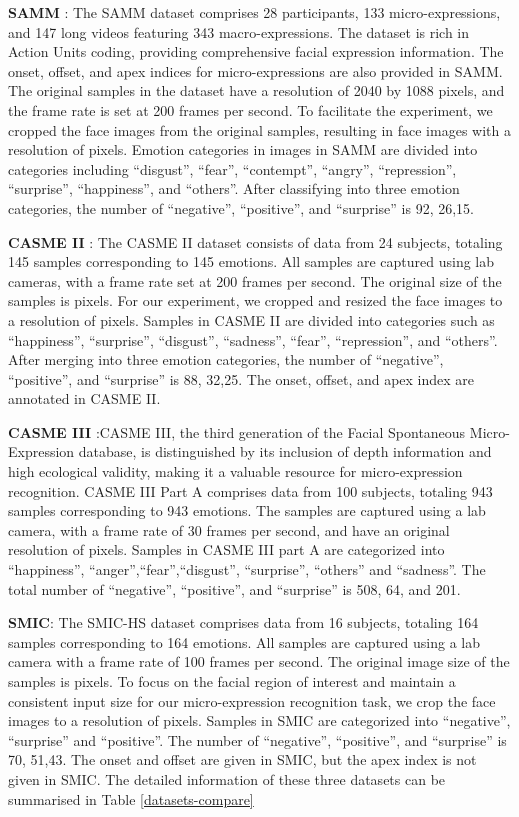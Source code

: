 \documentclass[review,12pt, 3p]{elsarticle}
\begin{document}
\textbf{SAMM} \cite{ref-48}: The SAMM dataset comprises 28 participants, 133 micro-expressions, and 147 long videos featuring 343 macro-expressions. The dataset is rich in Action Units coding, providing comprehensive facial expression information. The onset, offset, and apex indices for micro-expressions are also provided in SAMM. The original samples in the dataset have a resolution of 2040 by 1088 pixels, and the frame rate is set at 200 frames per second. To facilitate the experiment, we cropped the face images from the original samples, resulting in face images with a resolution of  pixels. Emotion categories in images in SAMM are divided into categories including ``disgust'', ``fear'', ``contempt'', ``angry'', ``repression'', ``surprise'', ``happiness'', and ``others''. After classifying into three emotion categories, the number of ``negative'', ``positive'', and ``surprise'' is 92, 26,15. 

\textbf{CASME II} \cite{ref-50}: The CASME II dataset consists of data from 24 subjects, totaling 145 samples corresponding to 145 emotions. All samples are captured using lab cameras, with a frame rate set at 200 frames per second. The original size of the samples is  pixels. For our experiment, we cropped and resized the face images to a resolution of  pixels. Samples in CASME II are divided into categories such as ``happiness'', ``surprise'', ``disgust'', ``sadness'', ``fear'', ``repression'', and ``others''. After merging into three emotion categories, the number of ``negative'', ``positive'', and ``surprise'' is 88, 32,25. The onset, offset, and apex index are annotated in CASME II. 

\textbf{CASME III} \cite{ref-51}:CASME III, the third generation of the Facial Spontaneous Micro-Expression database, is distinguished by its inclusion of depth information and high ecological validity, making it a valuable resource for micro-expression recognition. CASME III Part A comprises data from 100 subjects, totaling 943 samples corresponding to 943 emotions. The samples are captured using a lab camera, with a frame rate of 30 frames per second, and have an original resolution of  pixels. Samples in CASME III part A are categorized into ``happiness'',  ``anger'',``fear'',``disgust'',   ``surprise'', ``others'' and ``sadness''. The total number of ``negative'', ``positive'', and ``surprise'' is 508, 64, and 201. 

\textbf{SMIC}\cite{ref-49}: The SMIC-HS dataset comprises data from 16 subjects, totaling 164 samples corresponding to 164 emotions. All samples are captured using a lab camera with a frame rate of 100 frames per second. The original image size of the samples is  pixels. To focus on the facial region of interest and maintain a consistent input size for our micro-expression recognition task, we crop the face images to a resolution of  pixels. Samples in SMIC are categorized into ``negative'', ``surprise'' and ``positive''. The number of ``negative'', ``positive'', and ``surprise'' is 70, 51,43. The onset and offset are given in SMIC, but the apex index is not given in SMIC. The detailed information of these three datasets can be summarised in Table \ref{datasets-compare}
\end{document}
